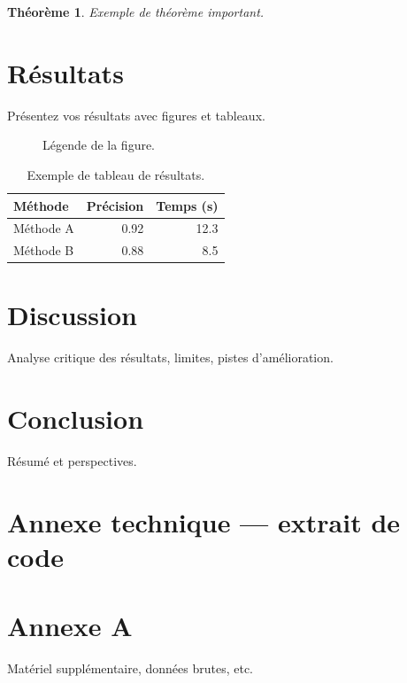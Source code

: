 \documentclass[11pt,a4paper]{article}
\newtheorem{theorem}{Théorème}[section]
\begin{document}
\begin{theorem}
Exemple de théorème important.
\end{theorem}

\section{Résultats}
Présentez vos résultats avec figures et tableaux.

\begin{figure}[H]
  \centering
  \caption{Légende de la figure.}
  \label{fig:ex}
\end{figure}

\begin{table}[H]
  \centering
  \begin{tabular}{lrr}
    \toprule
    Méthode & Précision & Temps (s) \\
    \midrule
    Méthode A & 0.92 & 12.3 \\
    Méthode B & 0.88 & 8.5 \\
    \bottomrule
  \end{tabular}
  \caption{Exemple de tableau de résultats.}
  \label{tab:res}
\end{table}

\section{Discussion}
Analyse critique des résultats, limites, pistes d'amélioration.

\section{Conclusion}
Résumé et perspectives.

\section{Annexe technique — extrait de code}

\clearpage
\printbibliography[title={Références}]

\appendix
\section{Annexe A}
Matériel supplémentaire, données brutes, etc.
\end{document}
